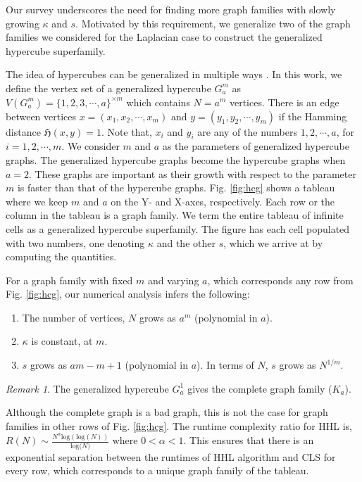 \documentclass[%
 reprint,
 superscriptaddress,
 amsmath,amssymb,
 aps,
 pra,
floatfix,
nofootinbib,
]{revtex4-2}
\theoremstyle{definition}
\theoremstyle{remark}
\newtheorem*{remark}{Remark}
\begin{document}
Our survey underscores the need for finding more graph families with slowly growing $\kappa$ and $s$. Motivated by this requirement, we generalize two of the graph families we considered for the Laplacian case to construct the generalized hypercube superfamily. 

The idea of hypercubes can be generalized in multiple ways \cite{ghcg}. In this work, we define the vertex set of a generalized hypercube $G_a^m$ as $V(G_a^m) = \{1, 2, 3, \cdots, a\}^{\times m}$ which contains $N = a^m$ vertices.  There is an edge between vertices $x = (x_1, x_2, \cdots, x_m)$ and $y = (y_1, y_2, \cdots, y_m)$ if the Hamming distance  $\mathfrak{H}(x, y) = 1$. Note that, $x_i$ and $y_i$ are any of the numbers $1, 2, \cdots, a$, for $i = 1, 2, \cdots, m$. We consider $m$ and $a$ as the parameters of generalized hypercube graphs. The generalized hypercube graphs become the hypercube graphs when $a = 2$. These graphs are important as their growth with respect to the parameter $m$ is faster than that of the hypercube graphs. Fig. \ref{fig:hcg} shows a tableau where we keep $m$ and $a$ on the Y- and X-axes, respectively. Each row or the column in the tableau is a graph family. We term the entire tableau of infinite cells as a generalized hypercube superfamily. The figure has each cell populated with two numbers, one denoting $\kappa$ and the other $s$, which we arrive at by computing the quantities. 

For a graph family with fixed $m$ and varying $a$, which corresponds any row from Fig. \ref{fig:hcg}, our numerical analysis infers the following:

\begin{enumerate}
\item The number of vertices, $N$ grows as $a^m$ (polynomial in $a$). 
\item $\kappa$ is constant, at $m$. 
\item $s$ grows as $am-m+1$ (polynomial in $a$). In terms of $N$, $s$ grows as $N^{1/m}$. 
\end{enumerate} 

\begin{remark} \label{rem:ghcg1}
The generalized hypercube $G_a^1$ gives the complete graph family ($K_a$). 
\end{remark} 

Although the complete graph is a bad graph, this is not the case for graph families in other rows of Fig. \ref{fig:hcg}. The runtime complexity ratio for HHL is, ${R}(N) \sim \frac{N^{\alpha} \mathrm{log}(\mathrm{log}(N))}{\mathrm{log(}N)} $ where $0<\alpha<1$. This ensures that there is an exponential separation between the runtimes of HHL algorithm and CLS for every row, which corresponds to a unique graph family of the tableau. 
\end{document}
